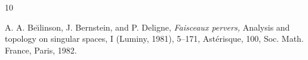 \documentclass[11pt]{amsart}
\theoremstyle{plain}
\theoremstyle{definition}
\theoremstyle{remark}
\begin{document}
\begin{thebibliography}{10}











 A. A. Be\u{\i}linson, J. Bernstein, and P. Deligne, {\em Faisceaux pervers,} Analysis and topology on singular spaces, I (Luminy, 1981), 5--171, Ast\'erisque, 100, Soc. Math. France, Paris, 1982.







\end{thebibliography}
\end{document}
